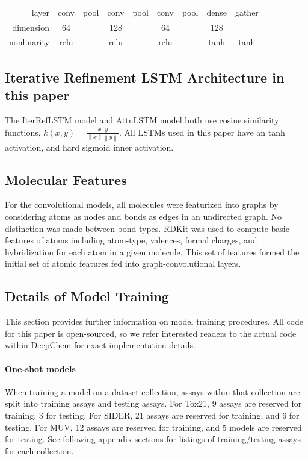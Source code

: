 \begin{table}
    \begin{tabular}{ r | c | c | c | c | c | c | c | c |}
    \cline{2-9}
    layer & conv & pool & conv & pool & conv & pool & dense & gather\\
    dimension & 64 & & 128 & & 64 & & 128 &\\
    nonlinarity & relu & & relu & & relu & & tanh & tanh\\
    \cline{2-9}
    \end{tabular}
    
\end{table}

\subsection{Iterative Refinement LSTM Architecture in this paper}

The IterRefLSTM model and AttnLSTM model both use cosine similarity functions, $k(x,y) = \frac{x\cdot y}{ \left\|x\right\|\left\|y\right\|}$. All LSTMs used in this paper have an tanh activation, and hard sigmoid inner activation.

\subsection{Molecular Features}

For the convolutional models, all molecules were featurized into graphs by considering atoms as nodes and bonds as edges in an undirected graph. No distinction was made between bond types. RDKit \cite{landrum2016} was used to compute basic features of atoms including atom-type, valences, formal charges, and hybridization for each atom in a given molecule. This set  of features formed the initial set of atomic features fed into graph-convolutional layers. 

\subsection{Details of Model Training}
This section provides further information on model training procedures. All code for this paper is open-sourced, so we refer interested readers to the actual code within DeepChem for exact implementation details.
\paragraph{One-shot models}
When training a model on a dataset collection, assays within that collection are split into training assays and testing assays. For Tox21, 9 assays are reserved for training, 3 for testing. For SIDER, 21 assays are reserved for training, and 6 for testing. For MUV, 12 assays are reserved for training, and 5 models are reserved for testing. See following appendix sections for listings of training/testing assays for each collection.

